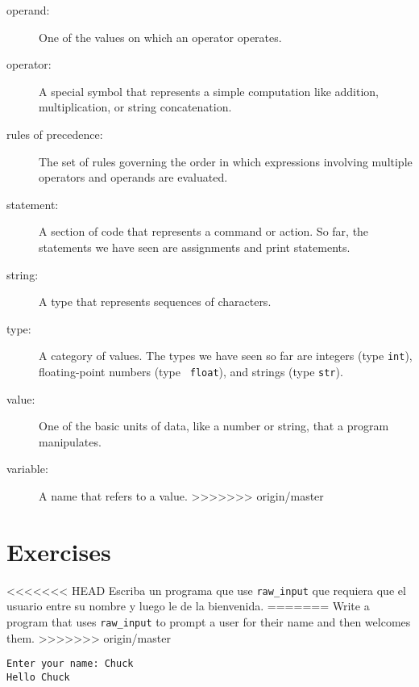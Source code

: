 \begin{ex}
\begin{description}
\begin{description}
\item[operand:]  One of the values on which an operator operates.

\item[operator:]  A special symbol that represents a simple computation like
addition, multiplication, or string concatenation.

\item[rules of precedence:]  The set of rules governing the order in which
expressions involving multiple operators and operands are evaluated.

\item[statement:]  A section of code that represents a command or action.  So
far, the statements we have seen are assignments and print statements.

\item[string:] A type that represents sequences of characters.

\item[type:] A category of values.  The types we have seen so far
are integers (type {\tt int}), floating-point numbers (type {\tt
float}), and strings (type {\tt str}).

\item[value:]  One of the basic units of data, like a number or string, 
that a program manipulates.

\item[variable:]  A name that refers to a value.
>>>>>>> origin/master

\end{description}

\section{Exercises}

\begin{ex}
<<<<<<< HEAD
Escriba un programa que use \verb"raw_input" que requiera que el usuario entre su nombre y luego le de la bienvenida.
=======
Write a program that uses  \verb"raw_input" to prompt a user for their name 
and then welcomes them.
>>>>>>> origin/master

\begin{verbatim}
Enter your name: Chuck
Hello Chuck
\end{verbatim}

\end{ex}


\end{description}
\end{ex}
